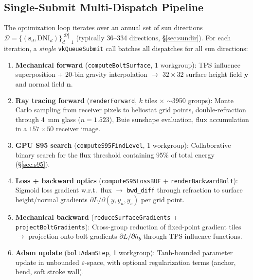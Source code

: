 \documentclass{CVM}
\begin{document}
\subsection{Single-Submit Multi-Dispatch Pipeline}

The optimization loop iterates over an annual set of sun directions
$\mathcal{D} = \{(\mathbf{s}_d, \text{DNI}_d)\}_{d=1}^{|\mathcal{D}|}$
(typically 36--334 directions, \S\ref{sec:sundir}). For each iteration, a
\emph{single} \verb|vkQueueSubmit| call batches all dispatches for all sun
directions:

\begin{enumerate}
  \item \textbf{Mechanical forward} (\verb|computeBoltSurface|, 1 workgroup):
  TPS influence superposition + 20-bin gravity interpolation $\rightarrow$
  $32\times32$ surface height field $\mathbf{y}$ and normal field $\mathbf{n}$.

  \item \textbf{Ray tracing forward} (\verb|renderForward|, $k$ tiles
  $\times$ $\sim$3950 groups): Monte Carlo sampling from receiver pixels to
  heliostat grid points, double-refraction through \SI{4}{\milli\meter} glass
  ($n=1.523$), Buie sunshape evaluation, flux accumulation in a $157\times50$
  receiver image.

  \item \textbf{GPU S95 search} (\verb|computeS95FindLevel|, 1 workgroup):
  Collaborative binary search for the flux threshold containing 95\% of total
  energy (\S\ref{sec:s95}).

  \item \textbf{Loss + backward optics} (\verb|computeS95LossBUF| +
  \verb|renderBackwardBolt|): Sigmoid loss gradient w.r.t.\ flux $\rightarrow$
  \verb|bwd_diff| through refraction to surface height/normal gradients
  $\partial L/\partial(y, y_u, y_v)$ per grid point.

  \item \textbf{Mechanical backward} (\verb|reduceSurfaceGradients| +
  \verb|projectBoltGradients|): Cross-group reduction of fixed-point
  gradient tiles $\rightarrow$ projection onto bolt gradients
  $\partial L/\partial h_b$ through TPS influence functions.

  \item \textbf{Adam update} (\verb|boltAdamStep|, 1 workgroup): Tanh-bounded
  parameter update in unbounded $\varepsilon$-space, with optional
  regularization terms (anchor, bend, soft stroke wall).
\end{enumerate}
\end{document}
